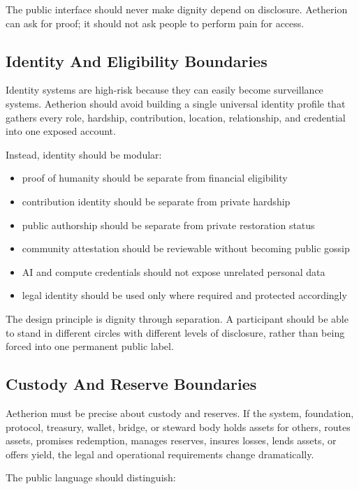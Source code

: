 \documentclass[12pt]{article}
\begin{document}
The public interface should never make dignity depend on disclosure. Aetherion can ask for proof; it should not ask people to perform pain for access.

\subsection{Identity And Eligibility Boundaries}

Identity systems are high-risk because they can easily become surveillance systems. Aetherion should avoid building a single universal identity profile that gathers every role, hardship, contribution, location, relationship, and credential into one exposed account.

Instead, identity should be modular:

\begin{itemize}
  \item proof of humanity should be separate from financial eligibility
  \item contribution identity should be separate from private hardship
  \item public authorship should be separate from private restoration status
  \item community attestation should be reviewable without becoming public gossip
  \item AI and compute credentials should not expose unrelated personal data
  \item legal identity should be used only where required and protected accordingly
\end{itemize}

The design principle is dignity through separation. A participant should be able to stand in different circles with different levels of disclosure, rather than being forced into one permanent public label.

\subsection{Custody And Reserve Boundaries}

Aetherion must be precise about custody and reserves. If the system, foundation, protocol, treasury, wallet, bridge, or steward body holds assets for others, routes assets, promises redemption, manages reserves, insures losses, lends assets, or offers yield, the legal and operational requirements change dramatically.

The public language should distinguish:
\end{document}
